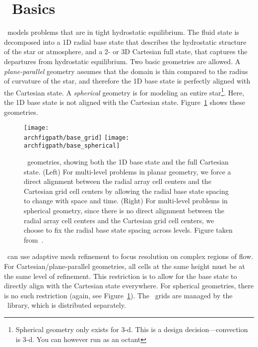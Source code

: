 \section{\maestro\ Basics}

\maestro\ models problems that are in tight hydrostatic equilibrium.
The fluid state is decomposed into a 1D radial base state that
describes the hydrostatic structure of the star or atmosphere, and a
2- or 3D Cartesian full state, that captures the departures from
hydrostatic equilibrium.  Two basic geometries are allowed.  A {\em
  plane-parallel} geometry assumes that the domain is thin compared to
the radius of curvature of the star, and therefore the 1D base state
is perfectly aligned with the Cartesian state.  A {\em spherical}
geometry is for modeling an entire star\footnote{Spherical geometry
  only exists for 3-d. This is a design decision---convection is 3-d.
  You can however run as an octant}.  Here, the 1D base state is not
aligned with the Cartesian state.  Figure~\ref{fig:base_state} shows
these geometries.

\begin{figure}[tb]
\centering
\texttt{[image: \\archfigpath/base\_grid]} \hspace{0.5in}
\texttt{[image: \\archfigpath/base\_spherical]}
\caption[\maestro\ geometries]{\label{fig:base_state} \maestro\ geometries, showing both the
  1D base state and the full Cartesian state.  (Left) For multi-level
  problems in planar geometry, we force a direct alignment between the
  radial array cell centers and the Cartesian grid cell centers by
  allowing the radial base state spacing to change with space and
  time.  (Right) For multi-level problems in spherical geometry, since
  there is no direct alignment between the radial array cell centers
  and the Cartesian grid cell centers, we choose to fix the radial
  base state spacing across levels. Figure taken
  from~\cite{multilevel}.}
\end{figure}


\maestro\ can use adaptive mesh refinement to focus resolution on
complex regions of flow.  For Cartesian/plane-parallel geometries, all
cells at the same height must be at the same level of refinement.
This restriction is to allow for the base state to directly align with
the Cartesian state everywhere.  For spherical geometries, there is no
such restriction (again, see Figure~\ref{fig:base_state}).
The \maestro\ grids are managed by the \amrex\ library, which is
distributed separately.



